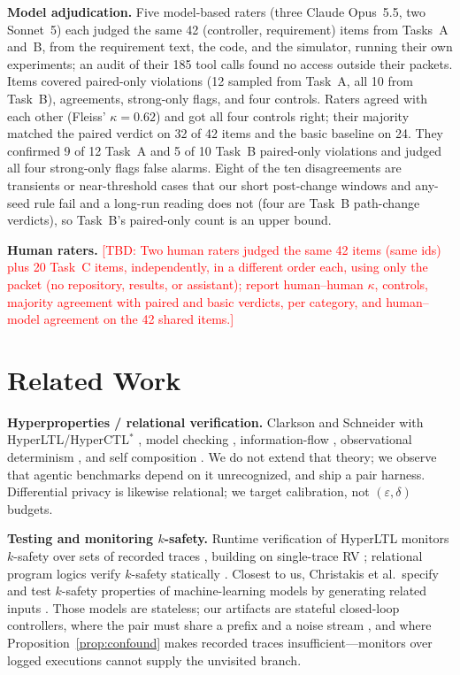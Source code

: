 \documentclass[sigconf,review,anonymous]{acmart}
\newcommand{\tbd}[1]{\textcolor{red}{[TBD: #1]}}
\begin{document}
	\textbf{Model adjudication.} Five model-based raters (three Claude
	Opus~5.5, two Sonnet~5) each judged the same 42 (controller,
	requirement) items from Tasks~A and~B, from the requirement text, the
	code, and the simulator, running their own experiments; an audit of
	their 185 tool calls found no access outside their packets. Items
	covered paired-only violations (12 sampled from Task~A, all 10 from
	Task~B), agreements, strong-only flags, and four controls. Raters agreed
	with each other (Fleiss' $\kappa=0.62$) and got all four controls right;
	their majority matched the paired verdict on 32 of 42 items and the
	basic baseline on 24. They confirmed 9 of 12 Task~A and 5 of 10 Task~B
	paired-only violations and judged all four strong-only flags false
	alarms. Eight of the ten disagreements are transients or near-threshold
	cases that our short post-change windows and any-seed rule fail and a
	long-run reading does not (four are Task~B path-change verdicts), so
	Task~B's paired-only count is an upper bound.

	\textbf{Human raters.} \tbd{Two human raters judged the same 42 items
	(same ids) plus 20 Task~C items, independently, in a different order
	each, using only the packet (no repository, results, or assistant);
	report human--human $\kappa$, controls, majority agreement with paired
	and basic verdicts, per category, and human--model agreement on the 42
	shared items.}

	\section{Related Work}
	\label{sec:related}
	
	\textbf{Hyperproperties / relational verification.} Clarkson and Schneider
	\cite{clarkson2010} with HyperLTL/HyperCTL$^*$ \cite{clarkson2014},
	model checking \cite{finkbeiner2015}, information-flow
	\cite{dimitrova2014}, observational determinism
	\cite{roscoe1995,zdancewic2003}, and self composition
	\cite{barthe2004,terauchi2005}. We do not extend that theory; we observe
	that agentic benchmarks depend on it unrecognized, and ship a pair harness.
	Differential privacy \cite{dwork2006,dwork2014} is likewise relational; we
	target calibration, not $(\varepsilon,\delta)$ budgets.
	
	\textbf{Testing and monitoring $k$-safety.} Runtime verification of
	HyperLTL monitors $k$-safety over sets of recorded traces
	\cite{agrawal2016,finkbeiner2019}, building on single-trace RV
	\cite{leucker2009,bartocci2018,falcone2018}; relational program logics
	verify $k$-safety statically \cite{sousa2016}. Closest to us, Christakis
	et al.\ specify and test $k$-safety properties of machine-learning
	models by generating related inputs \cite{christakis2023}. Those models
	are stateless; our artifacts are stateful closed-loop controllers, where
	the pair must share a prefix and a noise stream \cite{glasserman1992},
	and where Proposition~\ref{prop:confound} makes recorded traces
	insufficient---monitors over logged executions cannot supply the
	unvisited branch.
	
\end{document}
